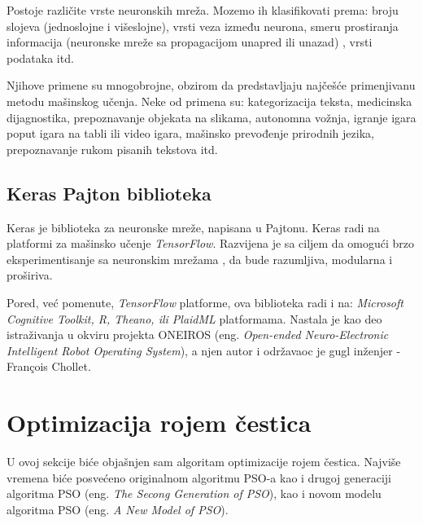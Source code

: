 \documentclass[a4paper]{article}
\begin{document}
{Postoje različite vrste neuronskih mreža. Mozemo ih klasifikovati prema: broju slojeva (jednoslojne i višeslojne), vrsti veza između neurona, smeru
prostiranja informacija (neuronske mreže sa propagacijom unapred ili unazad) \cite{website}, vrsti podataka itd. 

Njihove primene su mnogobrojne, obzirom da predstavljaju najčešće primenjivanu metodu mašinskog učenja. Neke od primena su: kategorizacija teksta,
medicinska dijagnostika, prepoznavanje objekata na slikama, autonomna vožnja, igranje igara poput igara na tabli ili video igara, mašinsko prevođenje
prirodnih jezika, prepoznavanje rukom pisanih tekstova itd. 

\subsection{Keras Pajton biblioteka}
\label{subsec:keras}

Keras je biblioteka za neuronske mreže, napisana u Pajtonu. Keras radi na platformi za mašinsko učenje  \textit{TensorFlow}.
Razvijena je sa ciljem da omogući brzo eksperimentisanje sa neuronskim mrežama \cite{keraswebsite},
da bude razumljiva, modularna i proširiva.

Pored, već pomenute, \textit{TensorFlow} platforme, ova biblioteka radi i na: \textit{Microsoft Cognitive Toolkit, R, Theano, ili PlaidML} platformama. 
Nastala je kao deo istraživanja u okviru projekta ONEIROS (eng. \emph{Open-ended Neuro-Electronic Intelligent Robot Operating System}), 
a njen autor i održavaoc je gugl inženjer -  François Chollet.

\section{Optimizacija rojem čestica}
\label{subsec:pso}
U ovoj sekcije biće objašnjen sam algoritam optimizacije rojem čestica. Najviše vremena biće posvećeno originalnom algoritmu PSO-a
kao i drugoj generaciji algoritma PSO (eng. \textit{The Secong Generation of PSO}), kao i novom modelu algoritma PSO 
(eng. \textit{A New Model of PSO}).


}
\end{document}
